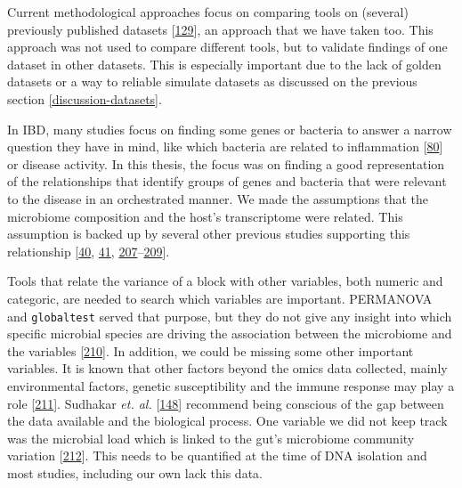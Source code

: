\documentclass[
  12pt,
  a4paper,
  twoside,
  openright]{book}
\begin{document}
Current methodological approaches focus on comparing tools on (several) previously published datasets {[}\protect\hyperlink{ref-cantini2021}{129}{]}, an approach that we have taken too.
This approach was not used to compare different tools, but to validate findings of one dataset in other datasets.
This is especially important due to the lack of golden datasets or a way to reliable simulate datasets as discussed on the previous section \ref{discussion-datasets}.

In IBD, many studies focus on finding some genes or bacteria to answer a narrow question they have in mind, like which bacteria are related to inflammation {[}\protect\hyperlink{ref-tang2017}{80}{]} or disease activity.
In this thesis, the focus was on finding a good representation of the relationships that identify groups of genes and bacteria that were relevant to the disease in an orchestrated manner.
We made the assumptions that the microbiome composition and the host's transcriptome were related.
This assumption is backed up by several other previous studies supporting this relationship {[}\protect\hyperlink{ref-thomas1998}{40}, \protect\hyperlink{ref-cornish2008}{41}, \protect\hyperlink{ref-holmes2012}{207}--\protect\hyperlink{ref-brand2021}{209}{]}.

Tools that relate the variance of a block with other variables, both numeric and categoric, are needed to search which variables are important.
PERMANOVA and \texttt{globaltest} served that purpose, but they do not give any insight into which specific microbial species are driving the association between the microbiome and the variables {[}\protect\hyperlink{ref-susin2020}{210}{]}.
In addition, we could be missing some other important variables.
It is known that other factors beyond the omics data collected, mainly environmental factors, genetic susceptibility and the immune response may play a role {[}\protect\hyperlink{ref-sartor2006}{211}{]}.
Sudhakar \emph{et. al.} {[}\protect\hyperlink{ref-sudhakar2022}{148}{]} recommend being conscious of the gap between the data available and the biological process.
One variable we did not keep track was the microbial load which is linked to the gut's microbiome community variation {[}\protect\hyperlink{ref-vandeputte2017}{212}{]}.
This needs to be quantified at the time of DNA isolation and most studies, including our own lack this data.
\end{document}

